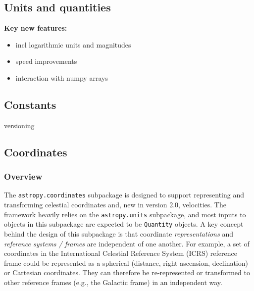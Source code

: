 \documentclass[modern]{aastex61}
\begin{document}

\subsection{Units and quantities}
\label{sec:units}

\textbf{Key new features:}
\begin{itemize}
	\item incl logarithmic units and magnitudes
	\item speed improvements
    \item interaction with numpy arrays
\end{itemize}

\subsection{Constants}
versioning


\subsection{Coordinates}
\label{sec:coordinates}

\subsubsection{Overview}
The \texttt{astropy.coordinates} subpackage is designed to support representing
and transforming celestial coordinates and, new in version 2.0, velocities.
The framework heavily relies on the \texttt{astropy.units} subpackage, and most
inputs to objects in this subpackage are expected to be \texttt{Quantity}
objects.
A key concept behind the design of this subpackage is that coordinate
\textit{representations} and \textit{reference systems / frames} are independent
of one another.
For example, a set of coordinates in the International Celestial Reference
System (ICRS) reference frame could be represented as a spherical (distance,
right ascension, declination) or Cartesian coordinates.
They can therefore be re-represented or transformed to other reference frames
(e.g., the Galactic frame) in an independent way.
\end{document}
